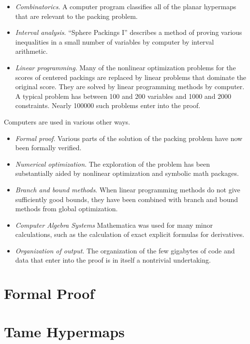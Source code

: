 \begin{itemize}
\item  {\it Combinatorics}.  A computer program classifies all of the planar hypermaps
that are relevant to the packing problem.
\item {\it  Interval analysis}.  ``Sphere Packings
I'' describes a method of proving various inequalities in a small number
of variables by computer by interval arithmetic.
\item {\it  Linear programming}.  Many of the nonlinear optimization
    problems for the scores of centered packings are replaced by linear
    problems that dominate the original score.  They are solved
    by linear programming methods by computer.  A typical problem has
    between 100 and 200 variables and 1000 and 2000 constraints.  Nearly
    100000
    such problems enter into the proof.
\end{itemize}

Computers are used in various other ways.  


\begin{itemize}
\item {\it Formal proof}.
    Various parts of the solution of the packing problem have now been
    formally verified.
\item  {\it Numerical optimization}.  The exploration of the problem
    has been substantially
    aided by nonlinear optimization and symbolic math packages.
\item {\it Branch and bound methods}.  When linear programming methods do not
    give sufficiently good bounds, they have been combined with branch
    and bound methods from global optimization.
\item {\it Computer Algebra Systems}  Mathematica was used for many minor calculations,
  such as the calculation of exact  explicit formulas for derivatives.
\item {\it Organization of output}.
    The organization of the few gigabytes of code and data that
    enter into the proof is in itself a nontrivial undertaking.
\end{itemize}



\section{Formal Proof}

\clearpage
\section{Tame Hypermaps}



